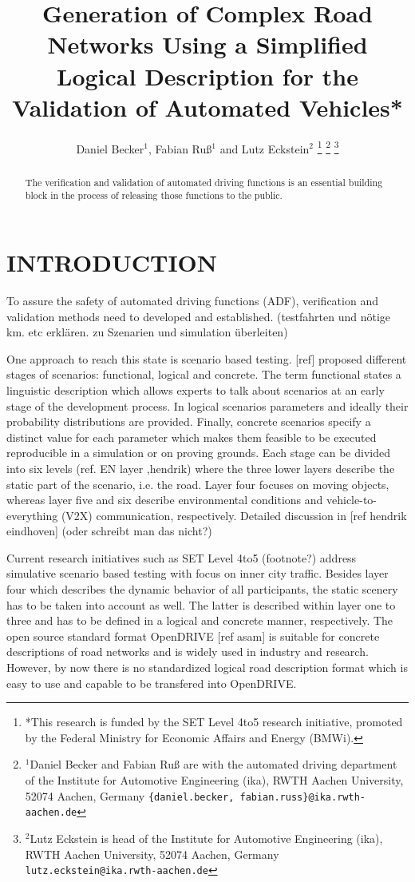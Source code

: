 \documentclass[a4paper, 10pt, conference]{ieeeconf}      %
\title{\LARGE \bf
Generation of Complex Road Networks Using a Simplified Logical Description for the Validation of Automated Vehicles*
}
\author{Daniel Becker$^{1}$, Fabian Ru{\ss}$^{1}$ and Lutz Eckstein$^{2}$%
\thanks{*This research is funded by the SET Level 4to5 research initiative, promoted by the	Federal Ministry for Economic Affairs and Energy (BMWi).}%
\thanks{$^{1}$Daniel Becker and Fabian Ru{\ss} are with the automated driving department of the Institute for Automotive Engineering (ika), RWTH Aachen University, 52074 	Aachen, Germany {\tt\small \{daniel.becker, fabian.russ\}@ika.rwth-aachen.de}}%
\thanks{$^{2}$Lutz Eckstein is head of the Institute for Automotive Engineering (ika), RWTH Aachen University, 52074 Aachen, Germany {\tt\small lutz.eckstein@ika.rwth-aachen.de}}%
}
\begin{document}
\maketitle
\thispagestyle{empty}
\pagestyle{empty}

\begin{abstract}
The verification and validation of automated driving functions is an essential building block in the process of releasing those functions to the public.  
\end{abstract}

\section{INTRODUCTION}

To assure the safety of automated driving functions (ADF), verification and validation methods need to developed and established. (testfahrten und nötige km. etc erklären. zu Szenarien und simulation überleiten)

One approach to reach this state is scenario based testing. [ref] proposed different stages of scenarios: functional, logical and concrete. The term functional states a linguistic description which allows experts to talk about scenarios at an early stage of the development process. In logical scenarios parameters and ideally their probability distributions are provided. Finally, concrete scenarios specify a distinct value for each parameter which makes them feasible to be executed reproducible in a simulation or on proving grounds. Each stage can be divided into six levels (ref. EN layer ,hendrik) where the three lower layers describe the static part of the scenario, i.e. the road. Layer four focuses on moving objects, whereas layer five and six describe environmental conditions and vehicle-to-everything (V2X) communication, respectively. Detailed discussion in [ref hendrik eindhoven] (oder schreibt man das nicht?)

Current research initiatives such as SET Level 4to5 (footnote?) address simulative scenario based testing with focus on inner city traffic. Besides layer four which describes the dynamic behavior of all participants, the static scenery has to be taken into account as well. The latter is described within layer one to three and has to be defined in a logical and concrete manner, respectively. The open source standard format OpenDRIVE [ref asam] is suitable for concrete descriptions of road networks and is widely used in industry and research. However, by now there is no standardized logical road description format which is easy to use and capable to be transfered into OpenDRIVE. 
\end{document}
